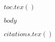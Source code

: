 \documentclass[12pt, b5paper,twoside]{upfthesis}
\begin{document}
\frontmatter

\maketitle

$toc.tex()$

$body$

$citations.tex()$

\backmatter

\printindex
\end{document}
